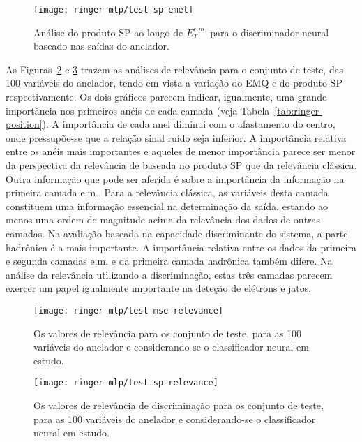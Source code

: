 \begin{figure}
\begin{center}
\texttt{[image: ringer-mlp/test-sp-emet]}
\end{center}
\caption{Análise do produto SP ao longo de $E^{e.m.}_T$ para o discriminador
neural baseado nas saídas do anelador.}
\label{fig:ringer-test-sp-emet}
\end{figure}

As Figuras~\ref{fig:ringer-mse-relevance} e \ref{fig:ringer-sp-relevance}
trazem as análises de relevância para o conjunto de teste, das 100 variáveis
do anelador, tendo em vista a variação do EMQ e do produto SP
respectivamente. Os dois gráficos parecem indicar, igualmente, uma grande
importância nos primeiros anéis de cada camada (veja
Tabela~\ref{tab:ringer-position}). A importância de cada anel diminui com o
afastamento do centro, onde pressupõe-se que a relação sinal ruído seja
inferior. A importância relativa entre os anéis mais importantes e aqueles de
menor importância parece ser menor da perspectiva da relevância de baseada no
produto SP que da relevância clássica. Outra informação que pode ser aferida é
sobre a importância da informação na primeira camada e.m.. Para a relevância
clássica, as variáveis desta camada constituem uma informação essencial na
determinação da saída, estando ao menos uma ordem de magnitude acima da
relevância dos dados de outras camadas. Na avaliação baseada na capacidade
discriminante do sistema, a parte hadrônica é a mais importante. A importância
relativa entre os dados da primeira e segunda camadas e.m. e da primeira
camada hadrônica também difere. Na análise da relevância utilizando a
discriminação, estas três camadas parecem exercer um papel igualmente
importante na deteção de elétrons e jatos.

\begin{figure}
\begin{center}
\texttt{[image: ringer-mlp/test-mse-relevance]}
\end{center}
\caption{Os valores de relevância para os conjunto de teste, para as 100
variáveis do anelador e considerando-se o classificador neural em estudo.}
\label{fig:ringer-mse-relevance}
\end{figure}

\begin{figure}
\begin{center}
\texttt{[image: ringer-mlp/test-sp-relevance]}
\end{center}
\caption{Os valores de relevância de discriminação para os conjunto de teste,
para as 100 variáveis do anelador e considerando-se o classificador neural em
estudo.}
\label{fig:ringer-sp-relevance}
\end{figure}

